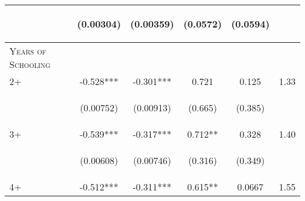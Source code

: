 \documentclass{article}[11pt,subeqn]
\begin{document}
\begin{spacing}{1.25}
\begin{table}[!htbp]
\begin{center}
\begin{tabular}{lccccc}
\vspace{4pt} & \begin{footnotesize}(0.00304)\end{footnotesize} & \begin{footnotesize}(0.00359)\end{footnotesize} & \begin{footnotesize}(0.0572)\end{footnotesize} & \begin{footnotesize}(0.0594)\end{footnotesize} & \begin{footnotesize}\end{footnotesize} \\
\midrule
\textsc{Years of Schooling} & & & & & \\
2+ & -0.528*** &	-0.301*** &	0.721 & 0.125 & 1.33 \\
\vspace{4pt} & \begin{footnotesize}(0.00752)\end{footnotesize} & \begin{footnotesize}(0.00913)\end{footnotesize}  & \begin{footnotesize}(0.665)\end{footnotesize} & \begin{footnotesize}(0.385)\end{footnotesize} & \begin{footnotesize}\end{footnotesize} \\
3+ &-0.539*** & -0.317*** & 0.712** & 0.328 & 1.40 \\
\vspace{4pt} & \begin{footnotesize}(0.00608)\end{footnotesize}& \begin{footnotesize}(0.00746)\end{footnotesize} & \begin{footnotesize}(0.316)\end{footnotesize} & \begin{footnotesize}(0.349)\end{footnotesize}  & \begin{footnotesize}\end{footnotesize} \\
4+ & -0.512*** & -0.311*** & 0.615** & 0.0667  & 1.55 \\

\end{tabular}
\end{center}
\end{table}
\end{spacing}
\end{document}
